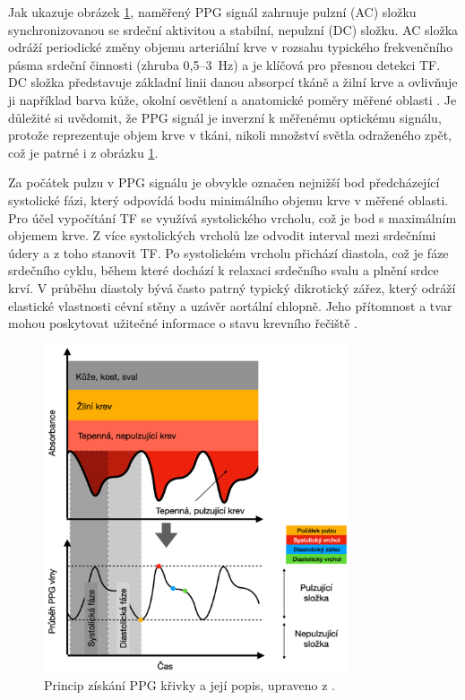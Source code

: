Jak ukazuje obrázek \ref{fig:signalPPG}, naměřený \acs{PPG} signál zahrnuje pulzní (AC) složku synchronizovanou se srdeční aktivitou a stabilní, nepulzní (DC) složku.
AC složka odráží periodické změny objemu arteriální krve v rozsahu typického frekvenčního pásma srdeční činnosti (zhruba 0,5--3~Hz) a je klíčová pro přesnou detekci \acs{TF}.
DC složka představuje základní linii danou absorpcí tkáně a žilní krve a ovlivňuje ji například barva kůže, okolní osvětlení a anatomické poměry měřené oblasti \cite{ENIKÖ, Park2022}.
Je důležité si uvědomit, že \acs{PPG} signál je inverzní k měřenému optickému signálu, protože reprezentuje objem krve v tkáni, nikoli množství světla odraženého zpět, což je patrné i z obrázku \ref{fig:signalPPG}.

Za počátek pulzu v \acs{PPG} signálu je obvykle označen nejnižší bod předcházející systolické fázi, který odpovídá bodu minimálního objemu krve v měřené oblasti.
Pro účel vypočítání \acs{TF} se využívá systolického vrcholu, což je bod s maximálním objemem krve.
Z více systolických vrcholů lze odvodit interval mezi srdečními údery a z toho stanovit \acs{TF}.
Po systolickém vrcholu přichází diastola, což je fáze srdečního cyklu, během které dochází k relaxaci srdečního svalu a plnění srdce krví.
V průběhu diastoly bývá často patrný typický dikrotický zářez, který odráží elastické vlastnosti cévní stěny a uzávěr aortální chlopně.
Jeho přítomnost a tvar mohou poskytovat užitečné informace o stavu krevního řečiště \cite{Orphanidou2018, Park2022}.

\begin{figure}[ht]
	\centering
	\includegraphics[width=0.8\textwidth]{./obrazky/signalPPG.png}
	\caption[Fiziologický popis PPG signálu]{Princip získání \acs{PPG} křivky a její popis, upraveno z \cite{Park2022}.}
	\label{fig:signalPPG}
\end{figure}